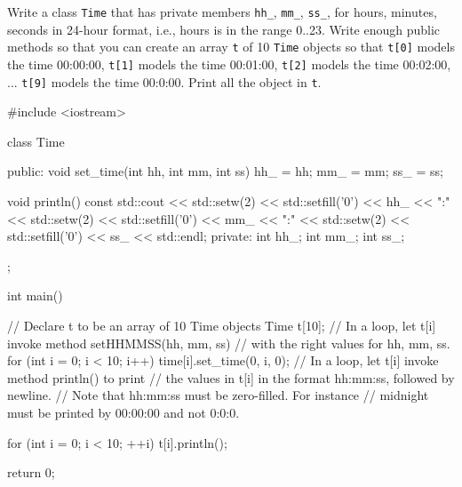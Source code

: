 

\nextq
Write a class \verb!Time! that has private members
\verb!hh_!,
\verb!mm_!,
\verb!ss_!,
for hours, minutes, seconds in 24-hour format, i.e.,
hours is in the range 0..23.
Write enough public methods so that you can
create an array \verb!t! of 10 \verb!Time! objects
so that
\verb!t[0]! models the time 00:00:00,
\verb!t[1]! models the time 00:01:00,
\verb!t[2]! models the time 00:02:00,
...
\verb!t[9]! models the time 00:0:00.
Print all the object in \verb!t!.
\\
\ANSWER
\begin{answercode}
#include <iostream>

class Time
{
public:
void set_time(int hh, int mm, int ss)
{
  hh_ = hh;
  mm_ = mm;
  ss_ = ss;
}

void println() const
{
  std::cout << std::setw(2) << std::setfill('0') << hh_ << ":"
  << std::setw(2) << std::setfill('0') << mm_ << ":"
  << std::setw(2) << std::setfill('0') << ss_ << std::endl;
}
private:
int hh_;
int mm_;
int ss_;
};

int main()
{
    // Declare t to be an array of 10 Time objects
    Time t[10];
    // In a loop, let t[i] invoke method setHHMMSS(hh, mm, ss)
    // with the right values for hh, mm, ss.
    for (int i = 0; i < 10; i++)
    {
      time[i].set_time(0, i, 0);
    }
    // In a loop, let t[i] invoke method println() to print
    // the values in t[i] in the format hh:mm:ss, followed by newline.
    // Note that hh:mm:ss must be zero-filled. For instance
    // midnight must be printed by 00:00:00 and not 0:0:0.

    for (int i = 0; i < 10; ++i)
    {
      t[i].println();
    }
    
    return 0;
}
\end{answercode}

